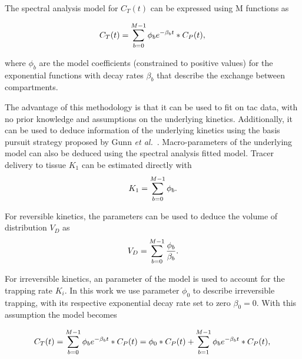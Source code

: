 The spectral analysis model for $C_T(t)$ can be expressed using M functions as

\begin{equation} 
\label{eqn:SpectralModel}
C_{T}(t)  =  \sum_{b=0}^{M-1} {\phi_b}  e^{-\beta_b t} \ast C_P(t)   \\ , \\
\end{equation}

where $\phi_b$ are the model coefficients (constrained to positive values) for the exponential functions with decay rates $\beta_b$ that describe the exchange between compartments. 

The advantage of this methodology is that it can be used to fit on \gls{tac} data, with no prior knowledge and assumptions on the underlying kinetics. Additionally, it can be used to deduce information of the underlying kinetics using the basis pursuit strategy proposed by Gunn \textit{et al.}~\cite{Gunn2002}.
Macro-parameters of the underlying model can also be deduced using the spectral analysis fitted model. Tracer delivery to tissue $K_1$ can be estimated directly with
\begin{equation} 
\label{eqn:SpectralModel_K1}
K_1  =  \sum_{b=0}^{M-1} {\phi_b}   \\ . \\
\end{equation}

For reversible kinetics, the parameters can be used to deduce the volume of distribution $V_D$ as
\begin{equation} 
\label{eqn:SpectralModel_VD}
V_D  =  \sum_{b=0}^{M-1} \frac{\phi_b}{\beta_b}   \\ . \\
\end{equation}

For irreversible kinetics, an parameter of the model is used to account for the trapping rate $K_i$. In this work we use parameter ${\phi_0}$ to describe irreversible trapping, with its respective exponential decay rate set to zero ${\beta_0} = 0 $. With this assumption the model becomes

\begin{equation} 
\label{eqn:SpectralModel_Complete}
C_{T}(t)  =  \sum_{b=0}^{M-1} {\phi_b}  e^{-\beta_b t} \ast C_P(t)  =  \phi_0 \ast C_P(t) + \sum_{b=1}^{M-1} {\phi_b}  e^{-\beta_b t} \ast C_P(t)  \\ , \\
\end{equation}

